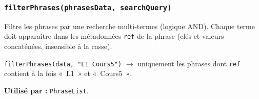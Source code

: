 \subsubsection{\texttt{filterPhrases(phrasesData, searchQuery)}}

Filtre les phrases par une recherche multi-termes (logique AND). Chaque terme doit apparaître dans les métadonnées \texttt{ref} de la phrase (clés et valeurs concaténées, insensible à la casse).

\begin{ukrbox}
\texttt{filterPhrases(data, "L1 Cours5")} $\rightarrow$ uniquement les phrases dont \texttt{ref} contient à la fois «~L1~» et «~Cours5~».
\end{ukrbox}

\textbf{Utilisé par :} \texttt{PhraseList}.
